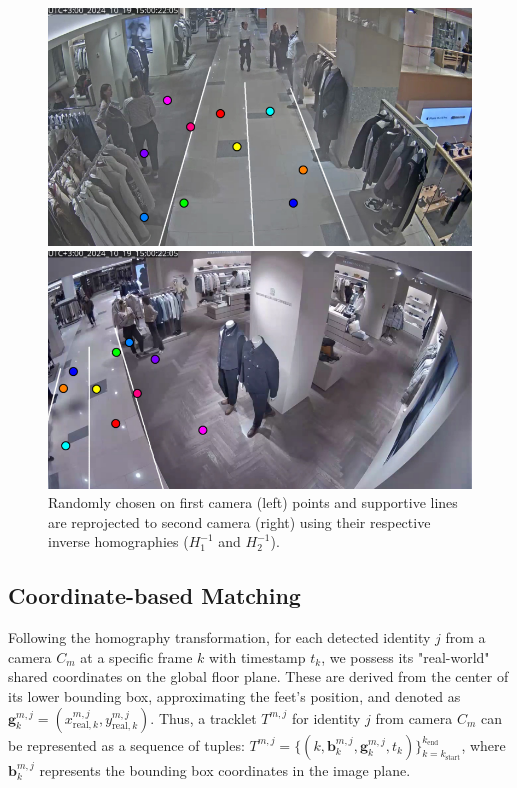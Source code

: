 \documentclass[12pt, a4paper]{article}
\begin{document}
\begin{figure}[H]
    \centering
    \begin{minipage}{0.48\linewidth}
        \centering
        \includegraphics[width=\linewidth]{pictures/camer1_random.png} %
    \end{minipage}
    \hfill %
    \begin{minipage}{0.48\linewidth}
        \centering
        \includegraphics[width=\linewidth]{pictures/camer2_random.png} %
    \end{minipage}
    \caption{Randomly chosen on first camera (left) points and supportive lines are reprojected to second camera (right) using their respective inverse homographies ($H_1^{-1}$ and $H_2^{-1}$).}
    \label{fig:projection_examples_pair}
\end{figure}


\subsection{Coordinate-based Matching}
\label{sec:coord_matching}
Following the homography transformation, for each detected identity $j$ from a camera $C_m$ at a specific frame $k$ with timestamp $t_k$, we possess its "real-world" shared coordinates on the global floor plane. These are derived from the center of its lower bounding box, approximating the feet's position, and denoted as $\mathbf{g}_k^{m,j} = (x_{\text{real},k}^{m,j}, y_{\text{real},k}^{m,j})$. Thus, a tracklet $T^{m,j}$ for identity $j$ from camera $C_m$ can be represented as a sequence of tuples: $T^{m,j} = \{ (k, \mathbf{b}_k^{m,j}, \mathbf{g}_k^{m,j}, t_k) \}_{k=k_{\text{start}}}^{k_{\text{end}}}$, where $\mathbf{b}_k^{m,j}$ represents the bounding box coordinates in the image plane.
\end{document}
